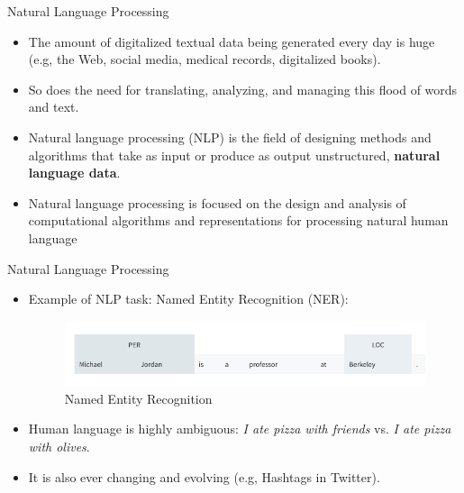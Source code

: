\documentclass[handout]{beamer}
\begin{document}
\begin{frame}{Natural Language Processing}
\begin{scriptsize}
\begin{itemize}

\item The amount of digitalized textual data being generated every day is huge (e.g, the Web, social media, medical records, digitalized books).

\item So does the need for translating, analyzing, and managing this flood of words and text.

\item Natural language processing (NLP) is the field of designing methods and algorithms that take as input or produce as output unstructured, \textbf{natural language data}. \cite{goldberg2017neural}

\item Natural language processing is focused on the design and analysis of computational algorithms and representations for processing natural human language \cite{jacobbook}

\end{itemize}
\end{scriptsize}
\end{frame}



\begin{frame}{Natural Language Processing}
\begin{scriptsize}
\begin{itemize}
\item Example of NLP task: Named Entity Recognition (NER):


     \begin{figure}[h]
        	\includegraphics[scale = 0.4]{pics/NER.png}
        	\caption{Named Entity Recognition}
        \end{figure}

        
\item Human language is highly ambiguous: \emph{I ate pizza with friends} vs. \emph{I ate pizza with olives}.

\item It is also ever changing and evolving (e.g, Hashtags in Twitter). 

\end{itemize}
\end{scriptsize}
\end{frame}
\end{document}
